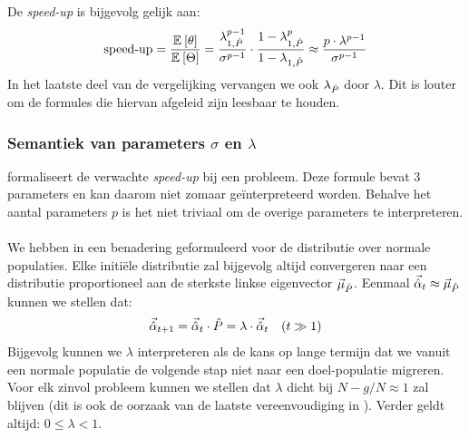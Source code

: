 De \emph{speed-up} is bijgevolg gelijk aan:
\begin{equation}
\mbox{speed-up}=\displaystyle\frac{\mean{\hittime}}{\mean{\phittime}}=\displaystyle\frac{\lambda_{1,\hat{P}}^{p-1}}{\sigma^{p-1}}\cdot\displaystyle\frac{1-\lambda_{1,\hat{P}}^{p}}{1-\lambda_{1,\hat{P}}}\approx\displaystyle\frac{p\cdot\lambda^{p-1}}{\sigma^{p-1}}
\eqnlab{speedupMetaheuristic}
\end{equation}
In het laatste deel van de vergelijking vervangen we ook $\ev[\hat{P}]$ door $\lambda$. Dit is louter om de formules die hiervan afgeleid zijn leesbaar te houden.

\subsubsection{Semantiek van parameters $\sigma$ en $\lambda$}

 formaliseert de verwachte \emph{speed-up} bij een probleem. Deze formule bevat 3 parameters en kan daarom niet zomaar ge\"interpreteerd worden. Behalve het aantal parameters $p$ is het niet triviaal om de overige parameters te interpreteren.

\paragraph{}
We hebben in  een benadering geformuleerd voor de distributie over normale populaties. Elke initi\"ele distributie zal bijgevolg altijd convergeren naar een distributie proportioneel aan de sterkste linkse eigenvector $\evl[\hat{P}]$. Eenmaal $\vec{\hat{\alpha}}_t\approx\evl[\hat{P}]$ kunnen we stellen dat:
\begin{equation}
\conditional{\vec{\hat{\alpha}}_{t+1}=\vec{\hat{\alpha}}_t\cdot\hat{P}=\lambda\cdot\vec{\hat{\alpha}}_{t}}{$t\gg 1$}
\end{equation}
Bijgevolg kunnen we $\lambda$ interpreteren als de kans op lange termijn dat we vanuit een normale populatie de volgende stap niet naar een doel-populatie migreren. Voor elk zinvol probleem kunnen we stellen dat $\lambda$ dicht bij $N-g/N\approx 1$ zal blijven (dit is ook de oorzaak van de laatste vereenvoudiging in ). Verder geldt altijd: $0\leq\lambda<1$.

\paragraph{}

